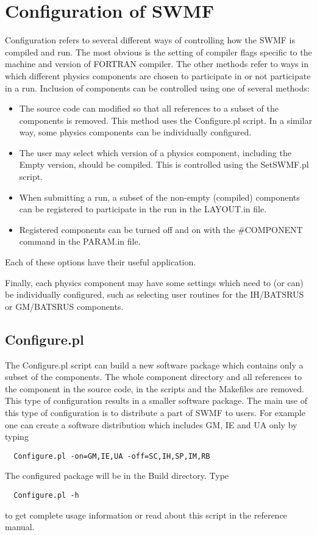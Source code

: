 \section{Configuration of SWMF}

Configuration refers to several different ways of controlling how the 
SWMF is compiled and run.  The most obvious is the setting of
compiler flags specific to the machine and version of FORTRAN
compiler.  The other methods refer to ways in which different physics
components are chosen to participate in or not participate in a run.
Inclusion of components can be controlled using one of several methods:

\begin{itemize}
\item The source code can modified so that all references %
      to a subset of the components is removed. %
      This method uses the Configure.pl script. %
      In a similar way, some physics components can be individually
      configured.
\item The user may select which version of a physics component,
  including the Empty version,
      should be compiled.  This is controlled using the SetSWMF.pl script.
\item When submitting a run, a subset of the non-empty (compiled) 
      components can be
      registered to participate in the run in the LAYOUT.in file.
\item Registered components can be turned off and on with the \#COMPONENT
      command in the PARAM.in file.
\end{itemize}
Each of these options have their useful application.

Finally, each physics component may have some settings which need to
(or can) be individually
configured, such as selecting user routines for the IH/BATSRUS or
GM/BATSRUS components.

\subsection{Configure.pl}
The Configure.pl script can build a new software package which
contains only a subset of the components. The whole
component directory and all references to the component 
in the source code, in the scripts and the Makefiles are removed.
This type of configuration results in a smaller software package.
The main use of this type of configuration is to distribute
a part of SWMF to users. For example one can create a 
software distribution which includes GM, IE and UA only by typing
\begin{verbatim}
  Configure.pl -on=GM,IE,UA -off=SC,IH,SP,IM,RB
\end{verbatim}
The configured package will be in the Build directory.  Type
\begin{verbatim}
  Configure.pl -h
\end{verbatim}
to get complete usage information or read about this script 
in the reference manual.


